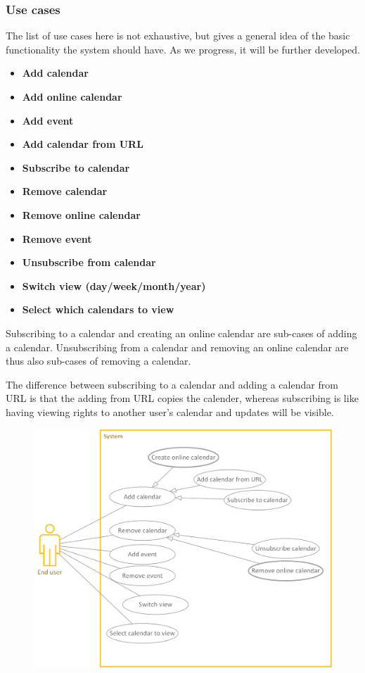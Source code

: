 \documentclass[10pt]{report}
\numberwithin{equation}{section} %
\numberwithin{figure}{section} %
\numberwithin{table}{section} %
\begin{document}
\subsubsection{Use cases}
The list of use cases here is not exhaustive, but gives a general idea of the
basic functionality the system should have. As we progress, it will be further
developed.
\begin{itemize}
\item \textbf{Add calendar}
\item \textbf{Add online calendar}
\item \textbf{Add event}
\item \textbf{Add calendar from URL}
\item \textbf{Subscribe to calendar}
\item \textbf{Remove calendar}
\item \textbf{Remove online calendar}
\item \textbf{Remove event}
\item \textbf{Unsubscribe from calendar}
\item \textbf{Switch view (day/week/month/year)}
\item \textbf{Select which calendars to view}
\end{itemize}

Subscribing to a calendar and creating an online calendar are sub-cases of
adding a calendar. Unsubscribing from a calendar and removing an online calendar
are thus also sub-cases of removing a calendar.

The difference between subscribing to a calendar and adding a calendar from URL
is that the adding from URL copies the calender, whereas subscribing is like
having viewing rights to another user's calendar and updates will be visible.

\clearpage
\begin{figure}
\includegraphics[scale=0.8]{use_case_diagram.png}
\end{figure}
\end{document}
